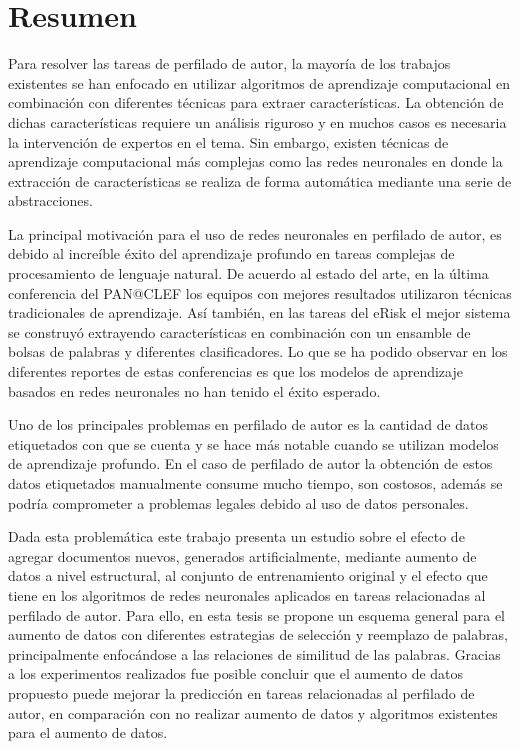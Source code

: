 \chapter{Resumen}

Para resolver las tareas de perfilado de autor, la mayoría de los trabajos existentes se han enfocado en utilizar algoritmos de aprendizaje computacional en combinación con diferentes técnicas para extraer características. La obtención de dichas características requiere un análisis riguroso y en muchos casos es necesaria la intervención de expertos en el tema. Sin embargo, existen técnicas de aprendizaje computacional más complejas como las redes neuronales en donde la extracción de características se realiza de forma automática mediante una serie de abstracciones.

La principal motivación para el uso de redes neuronales en perfilado de autor, es debido al increíble éxito del aprendizaje profundo en tareas complejas de procesamiento de lenguaje natural. De acuerdo al estado del arte, en la última conferencia del PAN@CLEF los equipos con mejores resultados utilizaron técnicas tradicionales de aprendizaje. Así también, en las tareas del eRisk el mejor sistema se construyó extrayendo características en combinación con un ensamble de bolsas de palabras y diferentes clasificadores. Lo que se ha podido observar en los diferentes reportes de estas conferencias es que los modelos de aprendizaje basados en redes neuronales no han tenido el éxito esperado. 

Uno de los principales problemas en perfilado de autor es la cantidad de datos etiquetados con que se cuenta y se hace más notable cuando se utilizan modelos de aprendizaje profundo. En el caso de perfilado de autor la obtención de estos datos etiquetados manualmente consume mucho tiempo, son costosos, además se podría comprometer a problemas legales debido al uso de datos personales. 

Dada esta problemática este trabajo presenta un estudio sobre el efecto de agregar documentos nuevos, generados artificialmente, mediante aumento de datos a nivel estructural, al  conjunto de entrenamiento original y el efecto que tiene en los algoritmos de redes neuronales aplicados en tareas relacionadas al perfilado de autor. Para ello, en esta tesis se propone un esquema general para el aumento de datos con diferentes estrategias de selección y reemplazo de palabras, principalmente enfocándose a las relaciones de similitud de las palabras. 
Gracias a los experimentos realizados fue posible concluir que el aumento de datos propuesto puede mejorar la predicción en tareas relacionadas al perfilado de autor, en comparación con no realizar aumento de datos y algoritmos existentes para el aumento de datos.

